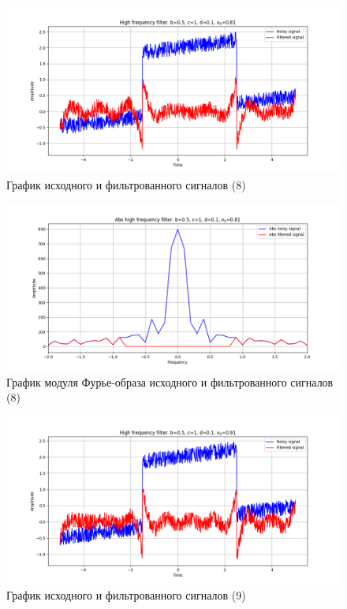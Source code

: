 \documentclass[a4paper, 12pt]{article}
\begin{document}
    \begin{figure}[!htb]
        \centering
        \includegraphics[scale=0.48]{8_u_flt_u_nolow.png}
        \captionsetup{skip=0pt}
        \caption{График исходного и фильтрованного сигналов (8)}
        \label{fig:fig41}
    \end{figure}
    \begin{figure}[!htb]
        \centering
        \includegraphics[scale=0.48]{8_abs_u_U_nolow.png}
        \captionsetup{skip=0pt}
        \caption{График модуля Фурье-образа исходного и фильтрованного сигналов (8)}
        \label{fig:fig42}
    \end{figure}
    \begin{figure}[!htb]
        \centering
        \includegraphics[scale=0.48]{9_u_flt_u_nolow.png}
        \captionsetup{skip=0pt}
        \caption{График исходного и фильтрованного сигналов (9)}
        \label{fig:fig43}
    \end{figure}
\end{document}
